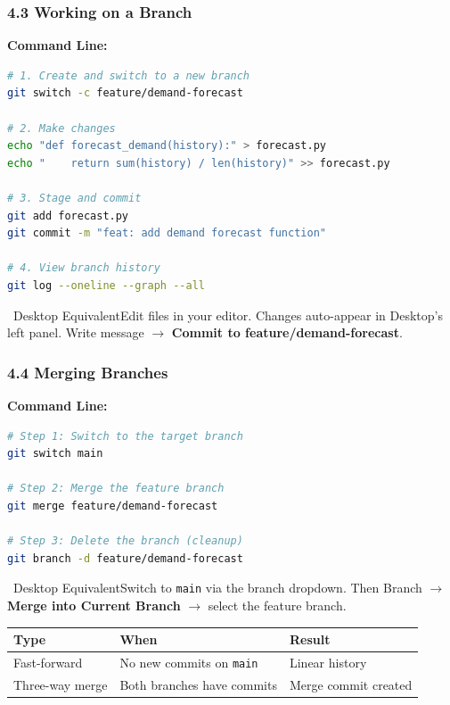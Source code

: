 \documentclass{beamer}
\newcommand{\desktoptip}[1]{\begin{block}{\faMousePointer\ Desktop Equivalent}#1\end{block}}
\begin{document}
\begin{frame}[fragile]
\frametitle{4.3 Working on a Branch}

\textbf{Command Line:}
\begin{lstlisting}[language=bash]
# 1. Create and switch to a new branch
git switch -c feature/demand-forecast

# 2. Make changes
echo "def forecast_demand(history):" > forecast.py
echo "    return sum(history) / len(history)" >> forecast.py

# 3. Stage and commit
git add forecast.py
git commit -m "feat: add demand forecast function"

# 4. View branch history
git log --oneline --graph --all
\end{lstlisting}

\desktoptip{Edit files in your editor. Changes auto-appear in Desktop's left panel. Write message $\rightarrow$ \textbf{Commit to feature/demand-forecast}.}
\end{frame}

\begin{frame}[fragile]
\frametitle{4.4 Merging Branches}

\textbf{Command Line:}
\begin{lstlisting}[language=bash]
# Step 1: Switch to the target branch
git switch main

# Step 2: Merge the feature branch
git merge feature/demand-forecast

# Step 3: Delete the branch (cleanup)
git branch -d feature/demand-forecast
\end{lstlisting}

\desktoptip{Switch to \texttt{main} via the branch dropdown. Then Branch $\rightarrow$ \textbf{Merge into Current Branch} $\rightarrow$ select the feature branch.}

\vspace{2mm}
\begin{table}[h]
\centering
\scriptsize
\begin{tabular}{lll}
\toprule
\textbf{Type} & \textbf{When} & \textbf{Result} \\
\midrule
Fast-forward & No new commits on \texttt{main} & Linear history \\
Three-way merge & Both branches have commits & Merge commit created \\
\bottomrule
\end{tabular}
\end{table}
\end{frame}
\end{document}
